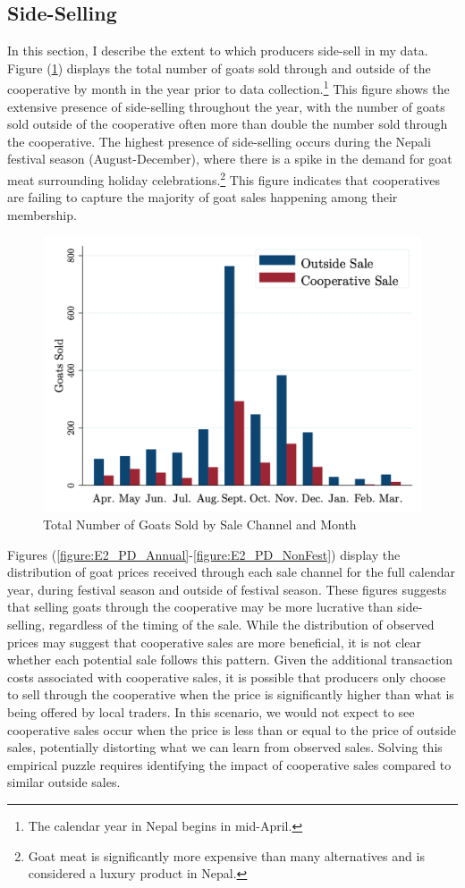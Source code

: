 \documentclass[11pt]{article}
\begin{document}
\subsection{Side-Selling} \label{sec:sidesell}

In this section, I describe the extent to which producers side-sell in my data. Figure (\ref{figure:E2_month}) displays the total number of goats sold through and outside of the cooperative by month in the year prior to data collection.\footnote{The calendar year in Nepal begins in mid-April.} This figure shows the extensive presence of side-selling throughout the year, with the number of goats sold outside of the cooperative often more than double the number sold through the cooperative. The highest presence of side-selling occurs during the Nepali festival season (August-December), where there is a spike in the demand for goat meat surrounding holiday celebrations.\footnote{Goat meat is significantly more expensive than many alternatives and is considered a luxury product in Nepal.} This figure indicates that cooperatives are failing to capture the majority of goat sales happening among their membership. 

\vspace{.5cm}
\begin{figure}[H]
    \caption{Total Number of Goats Sold by Sale Channel and Month}
    \label{figure:E2_month}
    \noindent \centering \includegraphics[width=.45\textwidth,trim=4 4 4 4,clip]{E2_SaleMonth.png}
\end{figure}

Figures (\ref{figure:E2_PD_Annual}-\ref{figure:E2_PD_NonFest}) display the distribution of goat prices received through each sale channel for the full calendar year, during festival season and outside of festival season. These figures suggests that selling goats through the cooperative may be more lucrative than side-selling, regardless of the timing of the sale. While the distribution of observed prices may suggest that cooperative sales are more beneficial, it is not clear whether each potential sale follows this pattern. Given the additional transaction costs associated with cooperative sales, it is possible that producers only choose to sell through the cooperative when the price is significantly higher than what is being offered by local traders. In this scenario, we would not expect to see cooperative sales occur when the price is less than or equal to the price of outside sales, potentially distorting what we can learn from observed sales. Solving this empirical puzzle requires identifying the impact of cooperative sales compared to similar outside sales.
\end{document}
